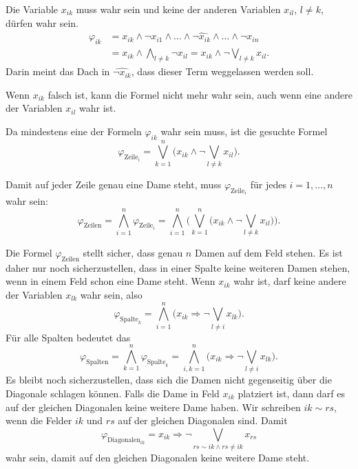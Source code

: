 \begin{loesung}
\begin{teilaufgaben}
\item
Die Variable $x_{ik}$ muss wahr sein und keine der anderen Variablen
$x_{il}$, $l\ne k$, dürfen wahr sein.
\begin{align*}
\varphi_{ik}
&=
x_{ik}\wedge \neg x_{i1} \wedge
\ldots
\wedge \widehat{\neg x_{ik}}\wedge
\ldots
\wedge \neg x_{in}
\\
&=
x_{ik} \wedge \bigwedge_{l\ne k} \neg x_{il}
=
x_{ik} \wedge \neg \bigvee_{l\ne k} x_{il}.
\end{align*}
Darin meint das Dach in $\widehat{\neg x_{ik}}$, dass dieser Term weggelassen
werden soll.
\item
Wenn $x_{ik}$ falsch ist, kann die Formel nicht mehr wahr sein, auch wenn 
eine andere der Variablen $x_{il}$ wahr ist.
\item
Da mindestens eine der Formeln $\varphi_{ik}$ wahr sein muss, ist
die gesuchte Formel
\begin{equation}
\varphi_{\text{Zeile}_i}
=
\bigvee_{k=1}^n
\biggl(
x_{ik} \wedge \neg \bigvee_{l\ne k} x_{il}
\biggr).
\label{70000072:zeile}
\end{equation}
\item
Damit auf jeder Zeile genau eine Dame steht, muss $\varphi_{\text{Zeile}_i}$
für jedes $i=1,\dots,n$ wahr sein:
\[
\varphi_{\text{Zeilen}}
=
\bigwedge_{i=1}^n
\varphi_{\text{Zeile}_i}
=
\bigwedge_{i=1}^n
\biggl(
\bigvee_{k=1}^n
\biggl(
x_{ik} \wedge \neg \bigvee_{l\ne k} x_{il}
\biggr)
\biggr).
\]
\item
Die Formel $\varphi_{\text{Zeilen}}$ stellt sicher, dass genau
$n$ Damen auf dem Feld stehen.
Es ist daher nur noch sicherzustellen, dass in einer Spalte
keine weiteren Damen stehen, wenn in einem Feld schon eine
Dame steht.
Wenn $x_{ik}$ wahr ist, darf keine andere der Variablen $x_{lk}$
wahr sein, also
\[
\varphi_{\text{Spalte}_k}
=
\bigwedge_{i=1}^n
\biggl(
x_{ik}\Rightarrow \neg \bigvee_{l\ne i}x_{lk}
\biggr).
\]
Für alle Spalten bedeutet das
\[
\varphi_{\text{Spalten}}
=
\bigwedge_{k=1}^n
\varphi_{\text{Spalte}_k}
=
\bigwedge_{i,k=1}^n
\biggl(
x_{ik}\Rightarrow \neg \bigvee_{l\ne i}x_{lk}
\biggr).
\]
Es bleibt noch sicherzustellen, dass sich die Damen nicht gegenseitig
über die Diagonale schlagen können.
Falls die Dame in Feld $x_{ik}$ platziert ist, dann darf es auf der
gleichen Diagonalen keine weitere Dame haben.
Wir schreiben $ik\sim rs$, wenn die Felder $ik$ und $rs$ auf der 
gleichen Diagonalen sind.
Damit 
\[
\varphi_{\text{Diagonalen}_{ik}}
=
x_{ik}\Rightarrow \neg\bigvee_{rs\sim ik\wedge rs\ne ik}  x_{rs}
\]
wahr sein, damit auf den gleichen Diagonalen keine weitere Dame steht.


\end{teilaufgaben}
\end{loesung}
